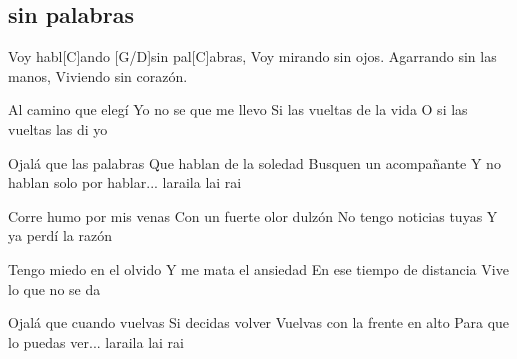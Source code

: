 \subsection*{sin palabras   }
\begin{guitar}
[Fmaj7] Voy habl[C]ando [G/D]sin pal[C]abras,
Voy mirando  sin   ojos.
Agarrando   sin las manos,
Viviendo   sin corazón.



Al camino que elegí
Yo no se que me llevo
Si las vueltas de la vida
O si las vueltas las di yo



Ojalá que las palabras
Que hablan de la soledad
Busquen un acompañante
Y no hablan solo por hablar... laraila lai rai



Corre humo por mis venas
Con un fuerte olor dulzón
No tengo noticias tuyas
Y ya perdí la razón



Tengo miedo en el olvido
Y me mata el ansiedad
En ese tiempo de distancia
Vive lo que no se da



Ojalá que cuando vuelvas
Si decidas volver
Vuelvas con la frente en alto
Para que lo puedas ver... laraila lai rai
\end{guitar}
